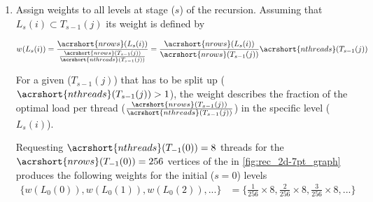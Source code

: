 \begin{enumerate}
	\item  Assign weights to all levels at stage ($s$) of the recursion. Assuming that $L_s(i) \subset T_{s-1}(j)$ its weight is defined by
	
	\begin{align*}
		w(L_s(i)) &= \frac{\acrshort{nrows}(L_s(i))}{\frac{\acrshort{nrows}(T_{s-1}(j))}{\acrshort{nthreads}(T_{s-1}(j))}} = \frac{\acrshort{nrows}(L_s(i))}{\acrshort{nrows}(T_{s-1}(j))}  \acrshort{nthreads}(T_{s-1}(j))\\
	\end{align*}
	
	 For a given \levelGroup ($T_{s-1}(j)$) that has to be split up ( $\acrshort{nthreads}(T_{s-1}(j)) > 1$), the weight describes the fraction of the optimal load per thread  ($\frac{\acrshort{nrows}(T_{s-1}(j))}{\acrshort{nthreads}(T_{s-1}(j))}$) in the specific level ($L_s(i)$).

	Requesting $\acrshort{nthreads}(T_{-1}(0))=8$ threads for the $\acrshort{nrows}(T_{-1}(0)) = 256$ vertices of the \stex in \cref{fig:rec_2d-7pt_graph} produces the following weights for the initial ($s=0$) levels
	\begin{align*}
		\{w(L_0(0)), w(L_0(1)), w(L_0(2)), ...\} &= \{\frac{1}{256} \times 8 , \frac{2}{256} \times 8 , \frac{3}{256} \times 8 , ...\}
	\end{align*}
	

\end{enumerate}
